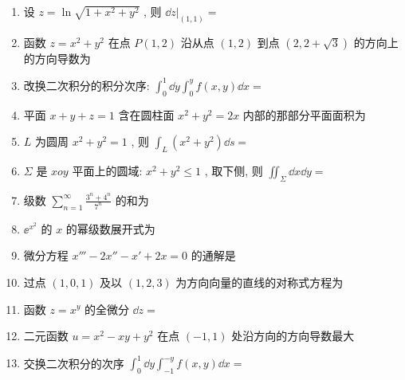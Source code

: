 \begin{enumerate}
	\item 设 $z=\ln \sqrt{1+x^{2}+y^{2}}$ , 则 $\dd\left.z\right|_{(1,1)}=$\underline{\hspace{8pc}}
	
	\item 函数 $z=x^{2}+y^{2}$ 在点 $P(1,2)$ 沿从点 $(1,2)$ 到点 $(2,2+\sqrt{3})$ 的方向上的方向导数为\underline{\hspace{8pc}}
	
	\item 改换二次积分的积分次序: $\int_{0}^{1} \dd y \int_{0}^{y} f(x, y) \dd x=$\underline{\hspace{8pc}}
	
	\item 平面 $x+y+z=1$ 含在圆柱面 $x^{2}+y^{2}=2 x$ 内部的那部分平面面积为\underline{\hspace{8pc}}
	
	\item $L$ 为圆周 $x^{2}+y^{2}=1$ , 则 $\int_{L}\left(x^{2}+y^{2}\right) \dd s=$\underline{\hspace{8pc}}
	
	\item $\Sigma$ 是 $xoy$ 平面上的圆域: $x^{2}+y^{2} \leq 1$ , 取下侧, 则 $\iint_{\Sigma} \dd x \dd y=$\underline{\hspace{8pc}}
	
	\item 级数 $\sum_{n=1}^{\infty} \frac{3^{n}+4^{n}}{7^{n}}$ 的和为\underline{\hspace{8pc}}
	
	\item $\ee^{x^{2}}$ 的 $x$ 的幂级数展开式为\underline{\hspace{8pc}}
	
	\item 微分方程 $x'''-2x''-x'+2x=0$ 的通解是\underline{\hspace{8pc}}

	\item 过点 $(1,0,1)$ 及以 $(1,2,3)$ 为方向向量的直线的对称式方程为\underline{\hspace{8pc}}
	
	\item 函数 $z=x^y$ 的全微分 $\dd z=$\underline{\hspace{8pc}}
	
	\item 二元函数 $u=x^{2}-x y+y^{2}$ 在点 $(-1,1)$ 处沿方向\underline{\hspace{8pc}}的方向导数最大
	
	\item 交换二次积分的次序 $\int_0^1 \dd y\int_{-1}^{-y} f(x,y)\dd x=$\underline{\hspace{8pc}}
	

\end{enumerate}
